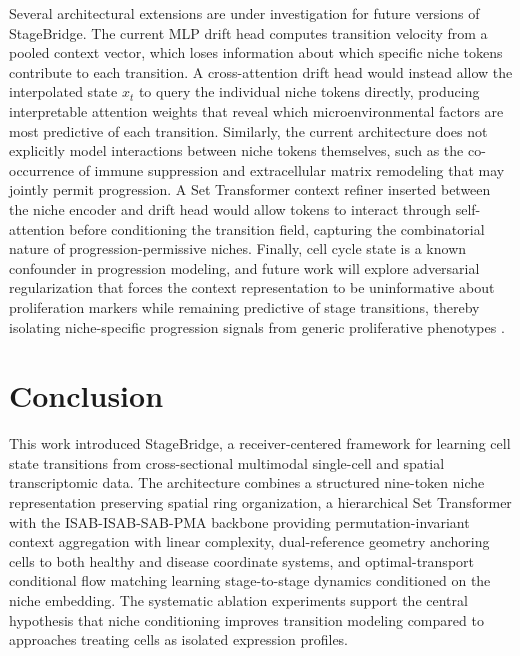 \documentclass[conference]{IEEEtran}
\begin{document}
Several architectural extensions are under investigation for future versions of StageBridge. The current MLP drift head computes transition velocity from a pooled context vector, which loses information about which specific niche tokens contribute to each transition. A cross-attention drift head would instead allow the interpolated state $x_t$ to query the individual niche tokens directly, producing interpretable attention weights that reveal which microenvironmental factors are most predictive of each transition. Similarly, the current architecture does not explicitly model interactions between niche tokens themselves, such as the co-occurrence of immune suppression and extracellular matrix remodeling that may jointly permit progression. A Set Transformer context refiner inserted between the niche encoder and drift head would allow tokens to interact through self-attention before conditioning the transition field, capturing the combinatorial nature of progression-permissive niches. Finally, cell cycle state is a known confounder in progression modeling, and future work will explore adversarial regularization that forces the context representation to be uninformative about proliferation markers while remaining predictive of stage transitions, thereby isolating niche-specific progression signals from generic proliferative phenotypes \cite{Karin2023-sa}.

\section{Conclusion}

This work introduced StageBridge, a receiver-centered framework for learning cell state transitions from cross-sectional multimodal single-cell and spatial transcriptomic data. The architecture combines a structured nine-token niche representation preserving spatial ring organization, a hierarchical Set Transformer with the ISAB-ISAB-SAB-PMA backbone providing permutation-invariant context aggregation with linear complexity, dual-reference geometry anchoring cells to both healthy and disease coordinate systems, and optimal-transport conditional flow matching learning stage-to-stage dynamics conditioned on the niche embedding. The systematic ablation experiments support the central hypothesis that niche conditioning improves transition modeling compared to approaches treating cells as isolated expression profiles.
\end{document}
